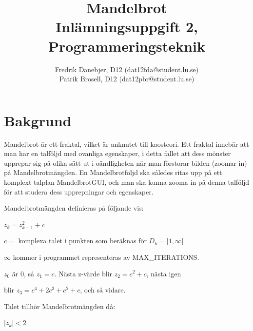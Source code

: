 \documentclass[a4paper]{article}
\title{Mandelbrot \\
	Inlämningsuppgift 2, Programmeringsteknik}
\author{Fredrik Danebjer, D12 (dat12fda@student.lu.se)\\
Patrik Brosell, D12 (dat12pbr@student.lu.se)}
\begin{document}

\maketitle                    %
\thispagestyle{empty}         %

\newpage

\section{Bakgrund}
Mandelbrot är ett fraktal, vilket är anknutet till kaosteori. Ett fraktal innebär att man har en talföljd med ovanliga egenskaper, i detta fallet att dess mönster upprepar sig på olika sätt ut i oändligheten när man förstorar bilden (zoomar in) på Mandelbrotmängden. 
En Mandelbrotföljd ska således ritas upp på ett komplext talplan MandelbrotGUI, och man ska kunna zooma in på denna talföljd för att studera dess upprepningar och egenskaper.

\vspace{4 mm}
Mandelbrotmängden definieras på följande vis:

\vspace{3 mm}
$z_{k} = z^2_{k-1} + c$
\vspace{3 mm}

$c =$ komplexa talet i punkten som beräknas för $D_{k} = [1, \infty[$

$\infty$ kommer i programmet representeras av MAX\_ITERATIONS.

$z_{0}$ är $0$, så $z_{1} = c$. Nästa z-värde blir $z_{2} = c^2 + c$, nästa igen 

blir $z_{3} = c^4 + 2c^3 + c^2 + c$, och så vidare.

Talet tillhör Mandelbrotmängden då:
\vspace{3 mm}

$|z_{k}| < 2$
\vspace{3 mm}
\end{document}
